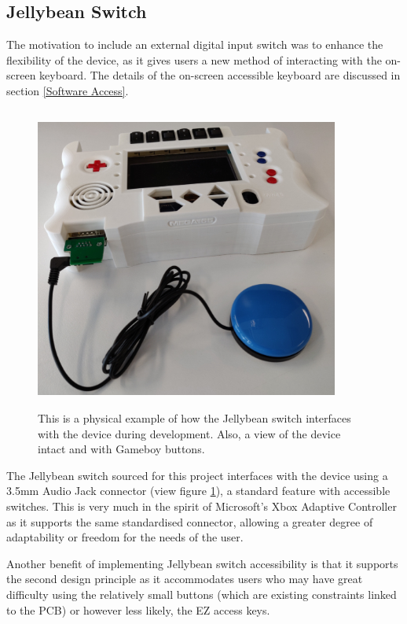 \subsection{Jellybean Switch} \label{Jellybean Switch}

The motivation to include an external digital input switch was to enhance the flexibility of the device, as it gives users a new method of interacting with the on-screen keyboard.
The details of the on-screen accessible keyboard are discussed in section \ref{Software Access}.

\begin{figure} [h]
    \centering
    \includegraphics[width=10cm,height=10cm,keepaspectratio]{Figures/jellybean.png}
    \caption{This is a physical example of how the Jellybean switch interfaces with the device during development. Also, a view of the device intact and with Gameboy buttons.}
    \label{fig:Jellybean}
\end{figure}

The Jellybean switch sourced for this project interfaces with the device using a 3.5mm Audio Jack connector (view figure \ref{fig:Jellybean}), a standard feature with accessible switches.
This is very much in the spirit of Microsoft's Xbox Adaptive Controller \cite{adaptive} as it supports the same standardised connector, allowing a greater degree of adaptability or freedom for the needs of the user.

Another benefit of implementing Jellybean switch accessibility is that it supports the second design principle as it accommodates users who may have great difficulty using the relatively small buttons (which are existing constraints linked to the PCB) or however less likely, the EZ access keys.

